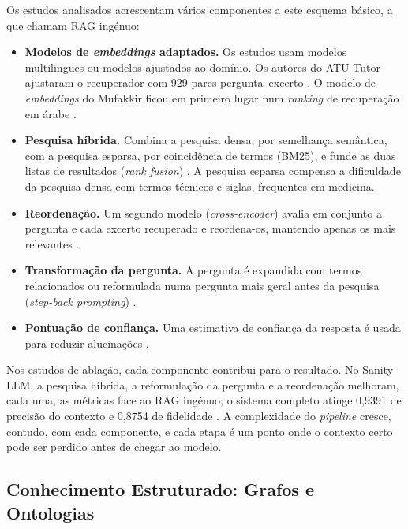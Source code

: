 Os estudos analisados acrescentam vários componentes a este esquema básico, a que \textcite{sbai2025advanced} chamam \gls{RAG} ingénuo:
\begin{itemize}
    \item \textbf{Modelos de \emph{embeddings} adaptados.} Os estudos usam modelos multilingues \parencite{nurfadhilah2025retrieval,sbai2025advanced} ou modelos ajustados ao domínio. Os autores do ATU-Tutor ajustaram o recuperador com 929 pares pergunta--excerto \parencite{sayeed2026tutor}. O modelo de \emph{embeddings} do Mufakkir ficou em primeiro lugar num \emph{ranking} de recuperação em árabe \parencite{tawfik2025mufakkir}.
    \item \textbf{Pesquisa híbrida.} Combina a pesquisa densa, por semelhança semântica, com a pesquisa esparsa, por coincidência de termos (BM25), e funde as duas listas de resultados (\emph{rank fusion}) \parencite{sbai2025advanced,sayeed2026tutor,christiawan2025sanity,yan2026question,tawfik2025mufakkir}. A pesquisa esparsa compensa a dificuldade da pesquisa densa com termos técnicos e siglas, frequentes em medicina.
    \item \textbf{Reordenação.} Um segundo modelo (\emph{cross-encoder}) avalia em conjunto a pergunta e cada excerto recuperado e reordena-os, mantendo apenas os mais relevantes \parencite{sayeed2026tutor,christiawan2025sanity,sbai2025advanced}.
    \item \textbf{Transformação da pergunta.} A pergunta é expandida com termos relacionados \parencite{sbai2025advanced} ou reformulada numa pergunta mais geral antes da pesquisa (\emph{step-back prompting}) \parencite{christiawan2025sanity}.
    \item \textbf{Pontuação de confiança.} Uma estimativa de confiança da resposta é usada para reduzir alucinações \parencite{sbai2025advanced}.
\end{itemize}
Nos estudos de ablação, cada componente contribui para o resultado. No Sanity-LLM, a pesquisa híbrida, a reformulação da pergunta e a reordenação melhoram, cada uma, as métricas face ao \gls{RAG} ingénuo; o sistema completo atinge 0,9391 de precisão do contexto e 0,8754 de fidelidade \parencite{christiawan2025sanity}. A complexidade do \emph{pipeline} cresce, contudo, com cada componente, e cada etapa é um ponto onde o contexto certo pode ser perdido antes de chegar ao modelo.

\subsection{Conhecimento Estruturado: Grafos e Ontologias}
\label{sec:chap2_kg}

